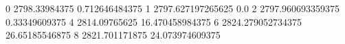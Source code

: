 0 2798.33984375 0.712646484375
1 2797.627197265625 0.0
2 2797.960693359375 0.33349609375
4 2814.09765625 16.470458984375
6 2824.279052734375 26.65185546875
8 2821.701171875 24.073974609375
